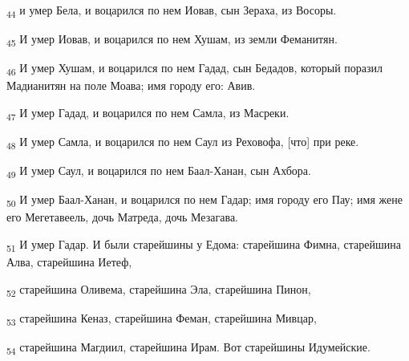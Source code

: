 \begin{tcolorbox}
\textsubscript{44} и умер Бела, и воцарился по нем Иовав, сын Зераха, из Восоры.
\end{tcolorbox}
\begin{tcolorbox}
\textsubscript{45} И умер Иовав, и воцарился по нем Хушам, из земли Феманитян.
\end{tcolorbox}
\begin{tcolorbox}
\textsubscript{46} И умер Хушам, и воцарился по нем Гадад, сын Бедадов, который поразил Мадианитян на поле Моава; имя городу его: Авив.
\end{tcolorbox}
\begin{tcolorbox}
\textsubscript{47} И умер Гадад, и воцарился по нем Самла, из Масреки.
\end{tcolorbox}
\begin{tcolorbox}
\textsubscript{48} И умер Самла, и воцарился по нем Саул из Реховофа, [что] при реке.
\end{tcolorbox}
\begin{tcolorbox}
\textsubscript{49} И умер Саул, и воцарился по нем Баал-Ханан, сын Ахбора.
\end{tcolorbox}
\begin{tcolorbox}
\textsubscript{50} И умер Баал-Ханан, и воцарился по нем Гадар; имя городу его Пау; имя жене его Мегетавеель, дочь Матреда, дочь Мезагава.
\end{tcolorbox}
\begin{tcolorbox}
\textsubscript{51} И умер Гадар. И были старейшины у Едома: старейшина Фимна, старейшина Алва, старейшина Иетеф,
\end{tcolorbox}
\begin{tcolorbox}
\textsubscript{52} старейшина Оливема, старейшина Эла, старейшина Пинон,
\end{tcolorbox}
\begin{tcolorbox}
\textsubscript{53} старейшина Кеназ, старейшина Феман, старейшина Мивцар,
\end{tcolorbox}
\begin{tcolorbox}
\textsubscript{54} старейшина Магдиил, старейшина Ирам. Вот старейшины Идумейские.
\end{tcolorbox}
